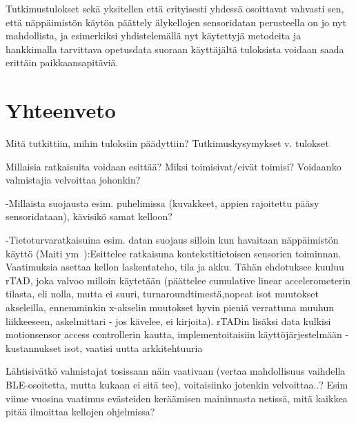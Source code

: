 \documentclass[finnish]{tktltiki2}
\theoremstyle{definition}
\theoremstyle{remark}
\begin{document}
Tutkimustulokset sekä yksitellen että erityisesti yhdessä osoittavat vahvasti sen, että näppäimistön käytön päättely älykellojen sensoridatan perusteella on jo nyt mahdollista, ja esimerkiksi yhdistelemällä nyt käytettyjä metodeita ja hankkimalla tarvittava opetusdata suoraan käyttäjältä tuloksista voidaan saada erittäin paikkaansapitäviä.

\section{Yhteenveto}

Mitä tutkittiin, mihin tuloksiin päädyttiin? Tutkimuskysymykset v. tulokset

Millaisia ratkaisuita voidaan esittää? Miksi toimisivat/eivät toimisi? Voidaanko valmistajia velvoittaa johonkin?

-Millaista suojausta esim. puhelimissa (kuvakkeet, appien rajoitettu pääsy sensoridataan), kävisikö samat kelloon?

-Tietoturvaratkaisuina esim. datan suojaus silloin kun havaitaan näppäimistön käyttö (Maiti ym~\cite{maiti}):Esittelee ratkaisuna kontekstitietoisen sensorien toiminnan. Vaatimuksia asettaa kellon laskentateho, tila ja akku. Tähän ehdotuksee kuuluu rTAD, joka valvoo milloin käytetään (päättelee cumulative linear accelerometerin tilasta, eli nolla, mutta ei suuri, turnaroundtimestä,nopeat isot muutokset akseleilla, ennemminkin x-akselin muutokset hyvin pieniä verrattuna muuhun liikkeeseen, askelmittari - jos kävelee, ei kirjoita). rTADin lisäksi data kulkisi motionsensor access controllerin kautta, implementoitaisiin käyttöjärjestelmään - kustannukset isot, vaatisi uutta arkkitehtuuria\linebreak

Lähtisivätkö valmistajat tosissaan näin vaativaan (vertaa mahdollisuus vaihdella BLE-osoitetta, mutta kukaan ei sitä tee), voitaisiinko jotenkin velvoittaa..? Esim viime vuosina vaatimus evästeiden keräämisen maininnasta netissä, mitä kaikkea pitää ilmoittaa kellojen ohjelmissa?




\pagebreak
%
%
% 
%







% 
\end{document}
